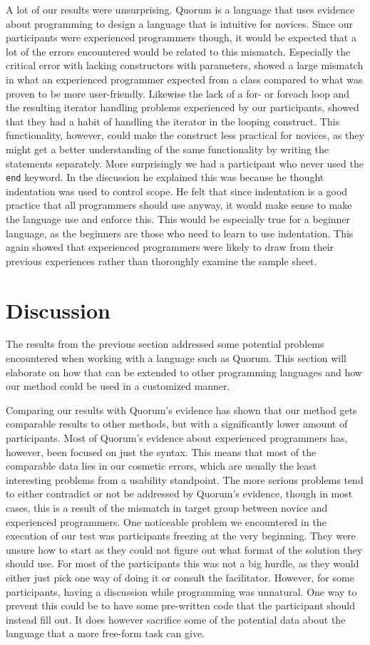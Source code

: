 \documentclass[preprint,10pt]{sigplanconf}
\begin{document}
A lot of our results were unsurprising.
Quorum is a language that uses evidence about programming to design a language that is intuitive for novices.
Since our participants were experienced programmers though, it would be expected that a lot of the errors encountered would be related to this mismatch.
Especially the critical error with lacking constructors with parameters, showed a large mismatch in what an experienced programmer expected from a class compared to what was proven to be more user-friendly\cite{ParamConstructors}.
Likewise the lack of a for- or foreach loop and the resulting iterator handling problems experienced by our participants, showed that they had a habit of handling the iterator in the looping construct.
This functionality, however, could make the construct less practical for novices, as they might get a better understanding of the same functionality by writing the statements separately.
More surprisingly we had a participant who never used the \lstinline!end! keyword.
In the discussion he explained this was because he thought indentation was used to control scope.
He felt that since indentation is a good practice that all programmers should use anyway, it would make sense to make the language use and enforce this.
This would be especially true for a beginner language, as the beginners are those who need to learn to use indentation.
This again showed that experienced programmers were likely to draw from their previous experiences rather than thoroughly examine the sample sheet.

\section{Discussion}
The results from the previous section addressed some potential problems encountered when working with a language such as Quorum. This section will elaborate on how that can be extended to other programming languages and how our method could be used in a customized manner.

Comparing our results with Quorum's evidence has shown that our method gets comparable results to other methods, but with a significantly lower amount of participants.
Most of Quorum's evidence about experienced programmers has, however, been focused on just the syntax.
This means that most of the comparable data lies in our cosmetic errors, which are usually the least interesting problems from a usability standpoint.
The more serious problems tend to either contradict or not be addressed by Quorum's evidence, though in most cases, this is a result of the mismatch in target group between novice and experienced programmers.
One noticeable problem we encountered in the execution of our test was participants freezing at the very beginning.
They were unsure how to start as they could not figure out what format of the solution they should use.
For most of the participants this was not a big hurdle, as they would either just pick one way of doing it or consult the facilitator.
However, for some participants, having a discussion while programming was unnatural.
One way to prevent this could be to have some pre-written code that the participant should instead fill out.
It does however sacrifice some of the potential data about the language that a more free-form task can give.
\end{document}
